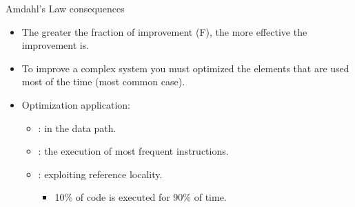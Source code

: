 \begin{frame}[t]{Amdahl's Law consequences}
\begin{itemize}
  \item The greater the fraction of improvement (F),
        the more effective the improvement is.

  \item To improve a complex system you must optimized the
        elements that are used most of the time (most common case).

  \item Optimization application:
    \begin{itemize}
      \item {}: 
            in the data path.
      \item {}: 
            the execution of most frequent instructions.
      \item {}:
            exploiting reference locality.
        \begin{itemize}
          \item 10\% of code is executed for 90\% of time.
        \end{itemize}
    \end{itemize}
\end{itemize}
\end{frame}
